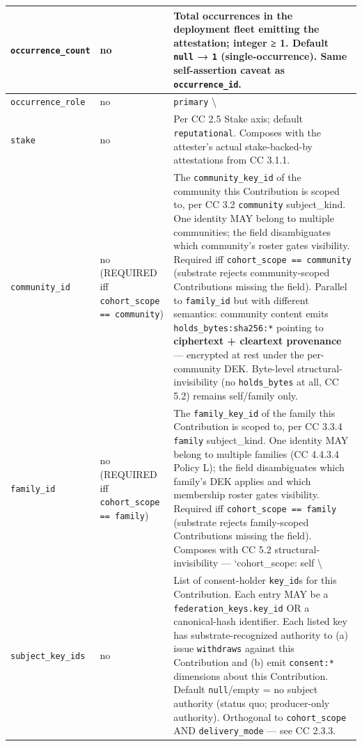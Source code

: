 \documentclass[11pt]{article}
\begin{document}
{\begin{longtable}{|p{5.33cm}|p{5.33cm}|p{5.33cm}|}
\texttt{occurrence\_count} & no & Total occurrences in the deployment fleet emitting the attestation; integer ≥ 1. Default \texttt{null} → \texttt{1} (single-occurrence). Same self-assertion caveat as \texttt{occurrence\_id}. \\ \hline
\texttt{occurrence\_role} & no & \texttt{primary} \textbackslash{} \\ \hline
\texttt{stake} & no & Per CC 2.5 Stake axis; default \texttt{reputational}. Composes with the attester's actual stake-backed-by attestations from CC 3.1.1. \\ \hline
\texttt{community\_id} & no (REQUIRED iff \texttt{cohort\_scope == community}) & The \texttt{community\_key\_id} of the community this Contribution is scoped to, per CC 3.2 \texttt{community} subject\_kind. One identity MAY belong to multiple communities; the field disambiguates which community's roster gates visibility. Required iff \texttt{cohort\_scope == community} (substrate rejects community-scoped Contributions missing the field). Parallel to \texttt{family\_id} but with different semantics: community content emits \texttt{holds\_bytes:sha256:*} pointing to \textbf{ciphertext + cleartext provenance} — encrypted at rest under the per-community DEK. Byte-level structural-invisibility (no \texttt{holds\_bytes} at all, CC 5.2) remains self/family only. \\ \hline
\texttt{family\_id} & no (REQUIRED iff \texttt{cohort\_scope == family}) & The \texttt{family\_key\_id} of the family this Contribution is scoped to, per CC 3.3.4 \texttt{family} subject\_kind. One identity MAY belong to multiple families (CC 4.4.3.4 Policy L); the field disambiguates which family's DEK applies and which membership roster gates visibility. Required iff \texttt{cohort\_scope == family} (substrate rejects family-scoped Contributions missing the field). Composes with CC 5.2 structural-invisibility — `cohort\_scope: self \textbackslash{} \\ \hline
\texttt{subject\_key\_ids} & no & List of consent-holder \texttt{key\_id}s for this Contribution. Each entry MAY be a \texttt{federation\_keys.key\_id} OR a canonical-hash identifier. Each listed key has substrate-recognized authority to (a) issue \texttt{withdraws} against this Contribution and (b) emit \texttt{consent:*} dimensions about this Contribution. Default \texttt{null}/empty = no subject authority (status quo; producer-only authority). Orthogonal to \texttt{cohort\_scope} AND \texttt{delivery\_mode} — see CC 2.3.3. \\ \hline

\end{longtable}}
\end{document}
